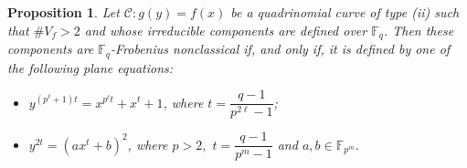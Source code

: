 \documentclass[preprint,12pt]{elsarticle}
\newtheorem{proposition}[theorem]{Proposition}
\begin{document}
\begin{proposition}
Let $\mathcal{C} \colon g(y) = f(x)$ be a quadrinomial curve of type (ii) such that $\# V_f > 2$ and whose irreducible components are defined over $\mathbb{F}_q$. Then these components are $\mathbb{F}_q$-Frobenius nonclassical if, and only if, it is defined by one of the following plane equations:
\begin{itemize}
    \item[(i)] $y^{(p^{\ell}+1)t} = x^{p^{\ell}t} + x^t + 1$, where $t = \dfrac{q - 1}{p^{2\ell} - 1}$;
    
    \item[(ii)] $y^{2t} = (ax^t + b)^2$, where $p > 2,$ $t = \dfrac{q - 1}{p^m - 1}$ and $a,b \in \mathbb{F}_{p^m}.$
\end{itemize}
\end{proposition}
\end{document}
